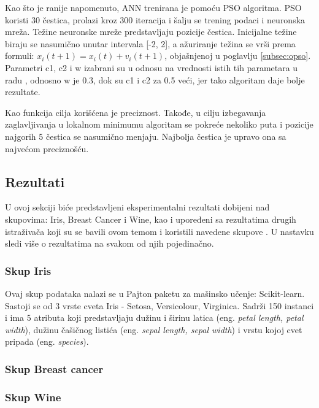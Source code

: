 \documentclass[a4paper]{article}
\begin{document}
{Kao što je ranije napomenuto, ANN trenirana je pomoću PSO algoritma. PSO koristi 30 čestica, prolazi kroz 300 iteracija i šalju se trening podaci i neuronska mreža. Težine neuronske mreže predstavljaju pozicije čestica. Inicijalne težine biraju se nasumično unutar intervala [-2, 2], a ažuriranje težina se vrši prema formuli: {$x_i(t+1) = x_i(t) + v_i(t+1)$}, objašnjenoj u poglavlju \ref{subsec:opso}. Parametri c1, c2 i w izabrani su u odnosu na vrednosti istih tih parametara u radu \cite{hindawi}, odnosno w je 0.3, dok su c1 i c2 za 0.5 veći, jer tako algoritam daje bolje rezultate. 

Kao funkcija cilja korišćena je preciznost. Takođe, u cilju izbegavanja zaglavljivanja u lokalnom minimumu algoritam se pokreće nekoliko puta i pozicije najgorih 5 čestica se nasumično menjaju. Najbolja čestica je upravo ona sa najvećom preciznošću.

\subsection{Rezultati}
\label{rezultati}

U ovoj sekciji biće predstavljeni eksperimentalni rezultati dobijeni nad skupovima: Iris, Breast Cancer i Wine, kao i upoređeni sa rezultatima drugih istraživača koji su se bavili ovom temom i koristili navedene skupove \cite{hindawi}. U nastavku sledi više o rezultatima na svakom od njih pojedinačno.

\subsubsection{Skup Iris}
\label{iris}

Ovaj skup podataka nalazi se u Pajton paketu za mašinsko učenje: Scikit-learn. Sastoji se od 3 vrste cveta Iris - Setosa, Versicolour, Virginica. Sadrži 150 instanci i ima 5 atributa koji predstavljaju dužinu i širinu latica (eng. \emph{petal length, petal width}), dužinu čašičnog listića (eng. \emph{sepal length, sepal width}) i vrstu kojoj cvet pripada (eng. \emph{species}). 


\subsubsection{Skup Breast cancer}
\label{breast}

\subsubsection{Skup Wine}
\label{wine}


}
\end{document}
